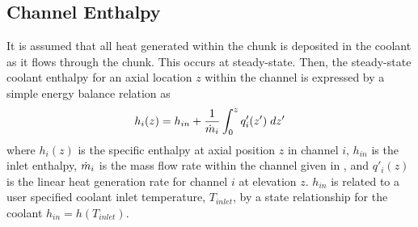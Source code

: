   \subsection{Channel Enthalpy}
    It is assumed that all heat generated within the chunk is deposited in the
    coolant as it flows through the chunk. This occurs at steady-state. Then, 
    the steady-state coolant enthalpy for an axial location $z$ within the 
    channel is expressed by a simple energy balance relation as
    \begin{equation}
      \label{eq:continuous_heat_balance}
      h_i(z) = h_{in} + \frac{1}{\dot{m}_i} \int_0^z q'_i(z') \; dz'
    \end{equation}
    where $h_i(z)$ is the specific enthalpy at axial position $z$ in channel 
    $i$, $h_{in}$ is the inlet enthalpy, $\dot{m}_i$ is the mass flow rate within
    the channel given in , and 
    $q'_i(z)$ is the linear heat generation rate for channel $i$ at elevation 
    $z$. $h_{in}$ is related to a user specified coolant inlet temperature,
    $T_{inlet}$, by a state relationship for the coolant 
    $h_{in} = h(T_{inlet})$.  

